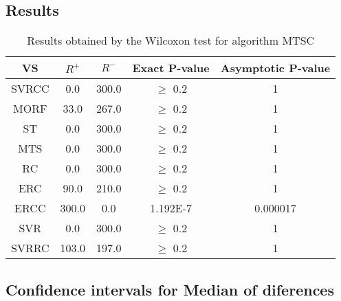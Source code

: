 \documentclass[a4paper,10pt]{article}
\begin{document}
\subsection{Results}

\begin{table}[!htp]
\centering\small
\begin{tabular}{
|c|c|c|c|c|}
\hline
 VS & $R^{+}$ & $R^{-}$ & Exact P-value & Asymptotic P-value \\ \hline 
SVRCC & 0.0 & 300.0 & $\geq$ 0.2 & 1\\ \hline 
MORF & 33.0 & 267.0 & $\geq$ 0.2 & 1\\ \hline 
ST & 0.0 & 300.0 & $\geq$ 0.2 & 1\\ \hline 
MTS & 0.0 & 300.0 & $\geq$ 0.2 & 1\\ \hline 
RC & 0.0 & 300.0 & $\geq$ 0.2 & 1\\ \hline 
ERC & 90.0 & 210.0 & $\geq$ 0.2 & 1\\ \hline 
ERCC & 300.0 & 0.0 & 1.192E-7 & 0.000017\\ \hline 
SVR & 0.0 & 300.0 & $\geq$ 0.2 & 1\\ \hline 
SVRRC & 103.0 & 197.0 & $\geq$ 0.2 & 1\\ \hline 

\end{tabular}
\caption{Results obtained by the Wilcoxon test for algorithm MTSC}
\end{table}

\subsection{Confidence intervals for Median of diferences}
\end{document}
